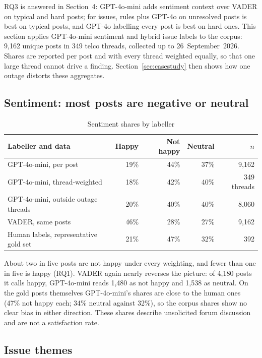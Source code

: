 \documentclass[11pt,a4paper]{article}
\begin{document}
RQ3 is answered in Section~4: GPT-4o-mini adds sentiment context over VADER on typical and hard posts; for issues, rules plus GPT-4o on unresolved posts is best on typical posts, and GPT-4o labelling every post is best on hard ones. This section applies GPT-4o-mini sentiment and hybrid issue labels to the corpus: 9,162 unique posts in 349 telco threads, collected up to 26~September~2026. Shares are reported per post and with every thread weighted equally, so that one large thread cannot drive a finding. Section~\ref{sec:casestudy} then shows how one outage distorts these aggregates.

\subsection{Sentiment: most posts are negative or neutral}

\begin{table}[H]
\centering
\caption{Sentiment shares by labeller}
\label{tab:corpussentiment}
\begin{tabular}{lrrrr}
\toprule
\textbf{Labeller and data} & \textbf{Happy} & \textbf{Not happy} & \textbf{Neutral} & \textbf{$n$} \\
\midrule
GPT-4o-mini, per post & 19\% & 44\% & 37\% & 9,162 \\
GPT-4o-mini, thread-weighted & 18\% & 42\% & 40\% & 349 threads \\
GPT-4o-mini, outside outage threads & 20\% & 40\% & 40\% & 8,060 \\
VADER, same posts & 46\% & 28\% & 27\% & 9,162 \\
Human labels, representative gold set & 21\% & 47\% & 32\% & 392 \\
\bottomrule
\end{tabular}
\end{table}

About two in five posts are not happy under every weighting, and fewer than one in five is happy (RQ1). VADER again nearly reverses the picture: of 4,180 posts it calls happy, GPT-4o-mini reads 1,480 as not happy and 1,538 as neutral. On the gold posts themselves GPT-4o-mini's shares are close to the human ones (47\% not happy each; 34\% neutral against 32\%), so the corpus shares show no clear bias in either direction. These shares describe unsolicited forum discussion and are not a satisfaction rate.

\subsection{Issue themes}
\end{document}
